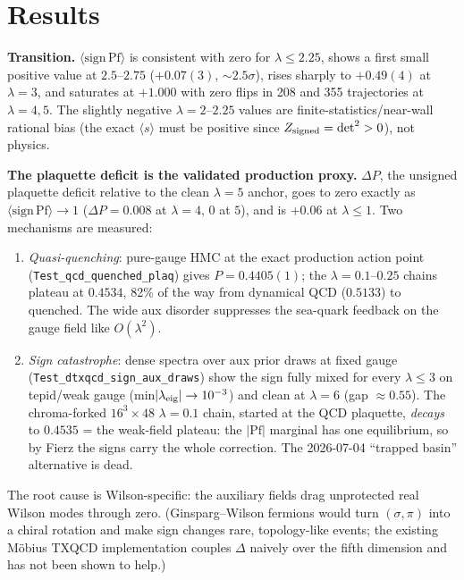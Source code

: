 \documentclass[11pt]{article}
\begin{document}
\section{Results}


\noindent\textbf{Transition.}  $\langle \mathrm{sign\,Pf}\rangle$ is consistent with zero for
$\lambda\le2.25$, shows a first small positive value at $2.5$--$2.75$ ($+0.07(3)$, $\sim2.5\sigma$),
rises sharply to $+0.49(4)$ at $\lambda=3$, and saturates at $+1.000$ with zero flips in 208 and
355 trajectories at $\lambda=4,5$.  The slightly negative $\lambda=2$--$2.25$ values are
finite-statistics/near-wall rational bias (the exact $\langle s\rangle$ must be positive since
$Z_{\rm signed}=\det^2>0$), not physics.

\noindent\textbf{The plaquette deficit is the validated production proxy.}  $\Delta P$, the
unsigned plaquette deficit relative to the clean $\lambda=5$ anchor, goes to zero exactly as
$\langle\mathrm{sign\,Pf}\rangle\to1$ ($\Delta P=0.008$ at $\lambda=4$, $0$ at $5$), and is
$+0.06$ at $\lambda\le1$.  Two mechanisms are measured:
\begin{enumerate}
\item \emph{Quasi-quenching}: pure-gauge HMC at the exact production action point
  (\texttt{Test\_qcd\_quenched\_plaq}) gives $P=0.4405(1)$; the $\lambda=0.1$--$0.25$ chains
  plateau at $0.4534$, 82\% of the way from dynamical QCD ($0.5133$) to quenched.  The wide aux
  disorder suppresses the sea-quark feedback on the gauge field like $O(\lambda^2)$.
\item \emph{Sign catastrophe}: dense spectra over aux prior draws at fixed gauge
  (\texttt{Test\_dtxqcd\_sign\_aux\_draws}) show the sign fully mixed for every $\lambda\le3$
  on tepid/weak gauge (min$|\lambda_{\rm eig}|\to10^{-3}$) and clean at $\lambda=6$
  (gap $\approx0.55$).  The chroma-forked $16^3\times48$ $\lambda=0.1$ chain, started at the
  QCD plaquette, \emph{decays} to $0.4535$ = the weak-field plateau: the $|\mathrm{Pf}|$ marginal
  has one equilibrium, so by Fierz the signs carry the whole correction.  The 2026-07-04
  ``trapped basin'' alternative is dead.
\end{enumerate}
The root cause is Wilson-specific: the auxiliary fields drag unprotected real Wilson modes
through zero.  (Ginsparg--Wilson fermions would turn $(\sigma,\pi)$ into a chiral rotation and
make sign changes rare, topology-like events; the existing Möbius TXQCD implementation couples
$\Delta$ naively over the fifth dimension and has not been shown to help.)
\end{document}
